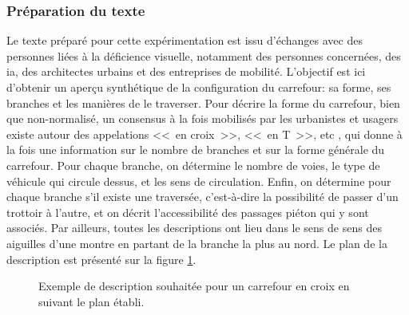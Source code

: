 \subsubsection{Préparation du texte}

Le texte préparé pour cette expérimentation est issu d'échanges avec des personnes liées à la déficience visuelle, notamment des personnes concernées, des \gls{ia}, des architectes urbains et des entreprises de mobilité. L'objectif est ici d'obtenir un aperçu synthétique de la configuration du carrefour: sa forme, ses branches et les manières de le traverser. Pour décrire la forme du carrefour, bien que non-normalisé, un consensus à la fois mobilisés par les urbanistes et usagers existe autour des appelations <<~en croix~>>, <<~en T~>>, etc \cite{fogliaroni2018}, qui donne à la fois une information sur le nombre de branches et sur la forme générale du carrefour. Pour chaque branche, on détermine le nombre de voies, le type de véhicule qui circule dessus, et les sens de circulation. Enfin, on détermine pour chaque branche s'il existe une traversée, c'est-à-dire la possibilité de passer d'un trottoir à l'autre, et on décrit l'accessibilité des passages piéton qui y sont associés. Par ailleurs, toutes les descriptions ont lieu dans le sens de sens des aiguilles d'une montre en partant de la branche la plus au nord. Le plan de la description est présenté sur la figure \ref{fig:experimentation_plan_description}.

\begin{figure}
    \centering
    \caption{Exemple de description souhaitée pour un carrefour en croix en suivant le plan établi.}
    \label{fig:experimentation_plan_description}
\end{figure}

